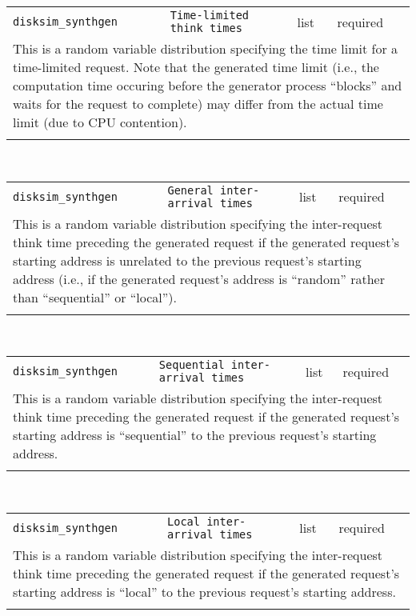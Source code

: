\noindent 
\begin{tabular}{|p{1.5in}|p{3.5in}|p{0.5in}|p{0.5in}|}
\cline{1-4}
\texttt{disksim\_synthgen} & \texttt{Time-limited think times} & list & required \\ 
\cline{1-4}
\multicolumn{4}{|p{6in}|}{
This is a random variable distribution specifying the time limit for a
time-limited request. Note that the generated time limit (i.e., the
computation time occuring before the generator process ``blocks'' and
waits for the request to complete) may differ from the actual time
limit (due to CPU contention).
}\\ 
\cline{1-4}
\multicolumn{4}{p{5in}}{}\\
\end{tabular}\\ 
\noindent 
\begin{tabular}{|p{1.5in}|p{3.5in}|p{0.5in}|p{0.5in}|}
\cline{1-4}
\texttt{disksim\_synthgen} & \texttt{General inter-arrival times} & list & required \\ 
\cline{1-4}
\multicolumn{4}{|p{6in}|}{
This is a random variable distribution specifying the inter-request think time
preceding the generated request if the generated request's starting
address is unrelated to the previous request's starting address (i.e.,
if the generated request's address is ``random'' rather than
``sequential'' or ``local'').
}\\ 
\cline{1-4}
\multicolumn{4}{p{5in}}{}\\
\end{tabular}\\ 
\noindent 
\begin{tabular}{|p{1.5in}|p{3.5in}|p{0.5in}|p{0.5in}|}
\cline{1-4}
\texttt{disksim\_synthgen} & \texttt{Sequential inter-arrival times} & list & required \\ 
\cline{1-4}
\multicolumn{4}{|p{6in}|}{
This is a random variable distribution specifying the inter-request think
time preceding the generated request if the generated request's
starting address is ``sequential'' to the previous request's starting
address.
}\\ 
\cline{1-4}
\multicolumn{4}{p{5in}}{}\\
\end{tabular}\\ 
\noindent 
\begin{tabular}{|p{1.5in}|p{3.5in}|p{0.5in}|p{0.5in}|}
\cline{1-4}
\texttt{disksim\_synthgen} & \texttt{Local inter-arrival times} & list & required \\ 
\cline{1-4}
\multicolumn{4}{|p{6in}|}{
This is a random variable distribution specifying the inter-request think time
preceding the generated request if the generated request's starting
address is ``local'' to the previous request's starting address.
}\\ 
\cline{1-4}
\multicolumn{4}{p{5in}}{}\\
\end{tabular}\\ 

